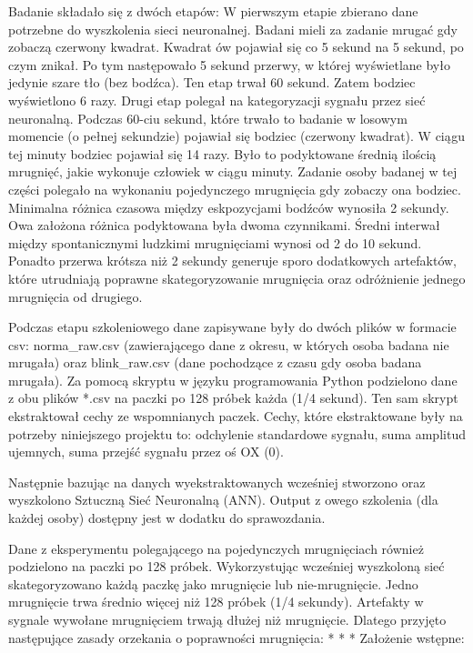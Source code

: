 \documentclass{article}
\begin{document}
    Badanie składało się z dwóch etapów: 
    W pierwszym etapie zbierano dane potrzebne do wyszkolenia sieci neuronalnej. Badani mieli za zadanie mrugać gdy zobaczą czerwony kwadrat. Kwadrat ów pojawiał się co 5 sekund na 5 sekund, po czym znikał. Po tym następowało 5 sekund przerwy, w której wyświetlane było jedynie szare tło (bez bodźca). Ten etap trwał 60 sekund. Zatem bodziec wyświetlono 6 razy.
    Drugi etap polegał na kategoryzacji sygnału przez sieć neuronalną. Podczas 60-ciu sekund, które trwało to badanie w losowym momencie (o pełnej sekundzie) pojawiał się bodziec (czerwony kwadrat). W ciągu tej minuty bodziec pojawiał się 14 razy. Było to podyktowane średnią ilością mrugnięć, jakie wykonuje człowiek w ciągu minuty.
    Zadanie osoby badanej w tej części polegało na wykonaniu pojedynczego mrugnięcia gdy zobaczy ona bodziec.
    Minimalna różnica czasowa między eskpozycjami bodźców wynosiła 2 sekundy. Owa założona różnica podyktowana była dwoma czynnikami. Średni interwał między spontanicznymi ludzkimi mrugnięciami wynosi od 2 do 10 sekund. Ponadto przerwa krótsza niż 2 sekundy generuje sporo dodatkowych artefaktów, które utrudniają poprawne skategoryzowanie mrugnięcia oraz odróżnienie jednego mrugnięcia od drugiego. 

    Podczas etapu szkoleniowego dane zapisywane były do dwóch plików w formacie csv: norma\_raw.csv (zawierającego dane z okresu, w których osoba badana nie mrugała) oraz blink\_raw.csv (dane pochodzące z czasu gdy osoba badana mrugała). Za pomocą skryptu w języku programowania Python podzielono dane z obu plików *.csv na paczki po 128 próbek każda (1/4 sekund). Ten sam skrypt ekstraktował cechy ze wspomnianych paczek. Cechy, które ekstraktowane były na potrzeby niniejszego projektu to: odchylenie standardowe sygnału, suma amplitud ujemnych, suma przejść sygnału przez oś OX (0). 

    Następnie bazując na danych wyekstraktowanych wcześniej stworzono oraz wyszkolono Sztuczną Sieć Neuronalną (ANN). Output z owego szkolenia (dla każdej osoby) dostępny jest w dodatku do sprawozdania. 

    Dane z eksperymentu polegającego na pojedynczych mrugnięciach również podzielono na paczki po 128 próbek. Wykorzystując wcześniej wyszkoloną sieć skategoryzowano każdą paczkę jako mrugnięcie lub nie-mrugnięcie. Jedno mrugnięcie trwa średnio więcej niż 128 próbek (1/4 sekundy). Artefakty w sygnale wywołane mrugnięciem trwają dłużej niż mrugnięcie. Dlatego przyjęto następujące zasady orzekania o poprawności mrugnięcia:
    \newline
    * * *
    \newline
    Założenie wstępne: 
    
\end{document}
